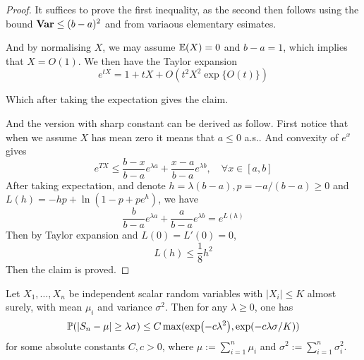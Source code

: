 \begin{proof}
    It suffices to prove the first inequality, as the second then follows using the bound $\mathbf{Var} \leq (b-a)^2$ and from variaous elementary esimates. 

    And by normalising $X$, we may assume $\mathbb{E}(X)=0$ and $b-a =1$, which implies that $X=O(1)$. We then have the Taylor expansion
    \begin{equation*}
        e^{tX} = 1+tX+O(t^2X^2 \exp \{O(t)\})
    \end{equation*}

    Which after taking the expectation gives the claim.

    And the version with sharp constant can be derived as follow. First notice that when we assume $X$ has mean zero it means that $a\leq 0$ a.s.. 
    And convexity of $e^x$ gives 
    \begin{equation*}
        e^{TX} \leq \frac{b-x}{b-a}e^{\lambda a} + \frac{x-a}{b-a}e^{\lambda b}, \quad \forall x \in [a,b]
    \end{equation*}
    After taking expectation, and denote $h=\lambda(b-a),p=-a/(b-a)\geq 0$ and $L(h)=-hp+\ln(1-p+pe^h)$, we have 
    \begin{equation*}
        \frac{b}{b-a}e^{\lambda a} + \frac{a}{b-a}e^{\lambda b} = e^{L(h)}
    \end{equation*}
    Then by Taylor expansion and $L(0)=L'(0)=0$,
    \begin{equation*}
        L(h)\leq \frac{1}{8}h^2
    \end{equation*}
    Then the claim is proved.
\end{proof}




\begin{theorem}
    \label{Chernoff inequality}
    Let $X_1,\dots,X_n$ be independent scalar random variables with $|X_i| \leq K $ almost surely, with mean $\mu_i$ and variance $\sigma^2$. Then for any $\lambda\geq0$, one has 
    \begin{equation*}
        \mathbb{P} (|S_n-\mu| \geq \lambda \sigma) \leq C \max(\exp (-c\lambda^2),\exp (-c \lambda \sigma /K))
    \end{equation*}
    for some absolute constants $C,c >0$, where $\mu := \sum_{i=1}^n \mu_i$ and $\sigma^2 := \sum_{i=1}^n \sigma^2_i$.
\end{theorem}

